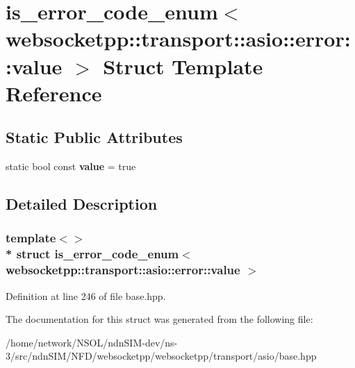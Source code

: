 \hypertarget{structis__error__code__enum_3_01websocketpp_1_1transport_1_1asio_1_1error_1_1value_01_4}{}\section{is\+\_\+error\+\_\+code\+\_\+enum$<$ websocketpp\+:\+:transport\+:\+:asio\+:\+:error\+:\+:value $>$ Struct Template Reference}
\label{structis__error__code__enum_3_01websocketpp_1_1transport_1_1asio_1_1error_1_1value_01_4}
\subsection*{Static Public Attributes}
\begin{DoxyCompactItemize}
\item 
static bool const {\bfseries value} = true\hypertarget{structis__error__code__enum_3_01websocketpp_1_1transport_1_1asio_1_1error_1_1value_01_4_aae5dbb38b63c54b30712a8d9437b4aeb}{}\label{structis__error__code__enum_3_01websocketpp_1_1transport_1_1asio_1_1error_1_1value_01_4_aae5dbb38b63c54b30712a8d9437b4aeb}

\end{DoxyCompactItemize}


\subsection{Detailed Description}
\subsubsection*{template$<$$>$\\*
struct is\+\_\+error\+\_\+code\+\_\+enum$<$ websocketpp\+::transport\+::asio\+::error\+::value $>$}



Definition at line 246 of file base.\+hpp.



The documentation for this struct was generated from the following file\+:\begin{DoxyCompactItemize}
\item 
/home/network/\+N\+S\+O\+L/ndn\+S\+I\+M-\/dev/ns-\/3/src/ndn\+S\+I\+M/\+N\+F\+D/websocketpp/websocketpp/transport/asio/base.\+hpp\end{DoxyCompactItemize}
